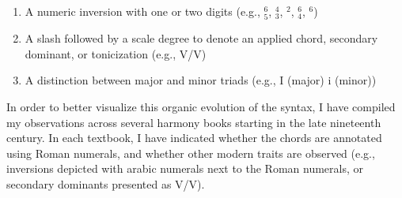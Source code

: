 \begin{enumerate}
    \item A numeric inversion with one or two digits (e.g., $^6_5$, $^4_3$, $^2$, $^6_4$, $^6$)
    \item A slash followed by a scale degree to denote an applied chord, secondary dominant, or tonicization (e.g., V/V)
    \item A distinction between major and minor triads (e.g., I (major) i (minor))
\end{enumerate}

In order to better visualize this organic evolution of the syntax, I have compiled my observations across several harmony books starting in the late nineteenth century.
In each textbook, I have indicated whether the chords are annotated using Roman numerals, and whether other modern traits are observed (e.g., inversions depicted with arabic numerals next to the Roman numerals, or secondary dominants presented as V/V).

